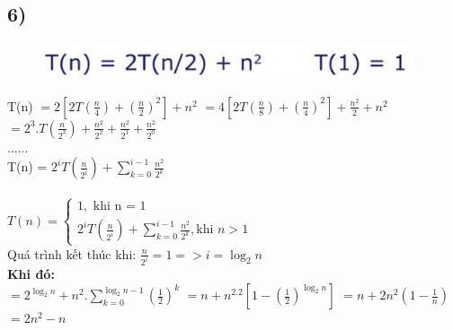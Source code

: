\documentclass[10pt,a4paper]{article}
\begin{document}
\subsection*{6)}
\begin{figure}[H]
    \centering
    \includegraphics[scale=.7]{images/26.png}
    \label{fig:my_label}
\end{figure}
T(n) 
$=2[2T(\frac{n}{4}) + (\frac{n}{2})^2] + n^2$ $=4[2T(\frac{n}{8}) + (\frac{n}{4})^2] + \frac{n^2}{2} + n^2$ $= 2^3.T(\frac{n}{2^3}) + \frac{n^2}{2^2} + \frac{n^2}{2^1} + \frac{n^2}{2^0}$\\
......\\
T(n) = $2^iT(\frac{n}{2^i})+\sum_{k=0}^{i-1}{\frac{n^2}{2^k}}$ \\ \\
$
T(n) = 
    \begin{cases}
        1, \text{ khi n = 1} \\
        2^iT(\frac{n}{2^i})+\sum_{k=0}^{i-1}{\frac{n^2}{2^k}} , \text{khi $n>1$}
    \end{cases}
$
\\
Quá trình kết thúc khi: $\frac{n}{2^i} = 1 => i = \log_{2}n$ \\
\textbf{Khi đó:}
\\
$=2^{\log_{2}n} + n^2.\sum_{k=0}^{\log_{2}n-1}{(\frac{1}{2})^k}$ 
$=n + n^2.2[1-(\frac{1}{2})^{\log_{2}n}]$ 
$=n + 2n^2(1-\frac{1}{n})$
$=2n^2-n$
\end{document}
